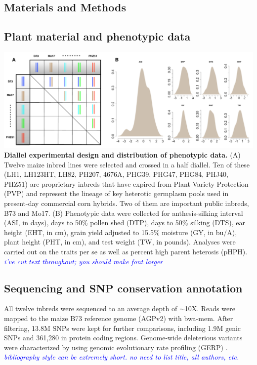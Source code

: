 \documentclass[a0,portrait]{a0poster}
\newcommand{\jri}[1]{\textcolor{blue}{ \emph{\scriptsize  #1}} }
\begin{document}
\begin{multicols}{2}

\section*{Materials and Methods}

\subsection*{Plant material and phenotypic data}
\begin{center}\vspace{1cm}
\includegraphics[width=0.8\linewidth]{pvp.pdf}
{\color{black} \textbf{Diallel experimental design and distribution of phenotypic data.}
(A) Twelve maize inbred lines were selected and crossed in a half diallel. Ten of these (LH1, LH123HT, LH82, PH207, 4676A, PHG39, PHG47, PHG84, PHJ40, PHZ51) are proprietary inbreds that have expired from Plant Variety Protection (PVP) and represent the lineage of key heterotic germplasm pools used in present-day commercial corn hybrids. Two of them are important public inbreds, B73 and Mo17. (B) Phenotypic data were collected for anthesis-silking interval (ASI, in days), days to 50\% pollen shed (DTP), days to 50\% silking (DTS), ear height (EHT, in cm), grain yield adjusted to 15.5\% moisture (GY, in bu/A), plant height (PHT, in cm), and test weight (TW, in pounds). Analyses were carried out on the traits per se as well as percent high parent heterosis (pHPH). \jri{i've cut text throughout; you should make font larger}
}
\end{center}\vspace{1cm}

\subsection*{Sequencing and SNP conservation annotation}
All twelve inbreds were sequenced to an average depth of $\sim$10X. Reads were mapped to the maize B73 reference genome (AGPv2) with bwa-mem.  After filtering, 13.8M SNPs were kept for further comparisons, including 1.9M genic SNPs and 361,280 in protein coding regions. Genome-wide deleterious variants were characterized by using genomic evolutionary rate profiling (GERP) \citep{Davydov2010}. \jri{bibliography style can be extremely short. no need to list title, all authors, etc.}


\end{multicols}
\end{document}
